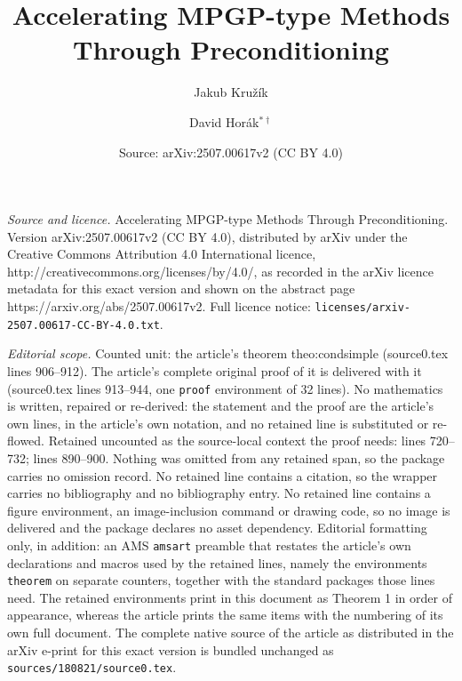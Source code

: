 \documentclass[10pt,a4paper]{amsart}
\title{Accelerating MPGP-type Methods Through Preconditioning}
\author{Jakub Kružík \and David Horák$^{* \dag}$}
\date{Source: arXiv:2507.00617v2 (CC BY 4.0)}
\begin{document}
\maketitle

\noindent\emph{Source and licence.} Accelerating MPGP-type Methods Through Preconditioning. Version arXiv:2507.00617v2 (CC BY 4.0), distributed by arXiv under the Creative Commons Attribution 4.0 International licence, http://creativecommons.org/licenses/by/4.0/, as recorded in the arXiv licence metadata for this exact version and shown on the abstract page https://arxiv.org/abs/2507.00617v2. Full licence notice: \texttt{licenses/arxiv-2507.00617-CC-BY-4.0.txt}.\par\smallskip

\noindent\textit{Editorial scope.} Counted unit: the article's theorem theo:condsimple (source0.tex lines 906--912). The article's complete original proof of it is delivered with it (source0.tex lines 913--944, one \texttt{proof} environment of 32 lines). No mathematics is written, repaired or re-derived: the statement and the proof are the article's own lines, in the article's own notation, and no retained line is substituted or re-flowed.  Retained uncounted as the source-local context the proof needs: lines 720--732; lines 890--900.  Nothing was omitted from any retained span, so the package carries no omission record.  No retained line contains a citation, so the wrapper carries no bibliography and no bibliography entry.  No retained line contains a figure environment, an image-inclusion command or drawing code, so no image is delivered and the package declares no asset dependency.  Editorial formatting only, in addition: an AMS \texttt{amsart} preamble that restates the article's own declarations and macros used by the retained lines, namely the environments \texttt{theorem} on separate counters, together with the standard packages those lines need.  The retained environments print in this document as Theorem 1 in order of appearance, whereas the article prints the same items with the numbering of its own full document.  The complete native source of the article as distributed in the arXiv e-print for this exact version is bundled unchanged as \texttt{sources/180821/source0.tex}.
\end{document}
